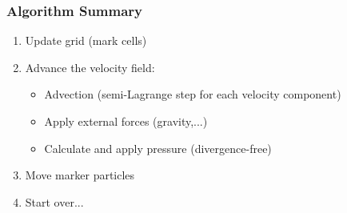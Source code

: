\begin{multicols}{2}
\begin{itemize}
\end{itemize}
%

\subsubsection{Algorithm Summary}
\begin{enumerate}
	\item Update grid (mark cells)
	\item Advance the velocity field:
		\begin{itemize}
			\item Advection (semi-Lagrange step for each velocity component)
			\item Apply external forces (gravity,...)
			\item Calculate and apply pressure (divergence-free) 
		\end{itemize}
	\item Move marker particles
	\item Start over...
\end{enumerate}


\end{multicols}
